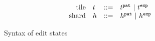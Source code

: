 \begin{figure}
\[\begin{array}{rlrl}
      \text{tile} & t & ::= &
        t^{\texttt{pat}} ~\vert~
        t^{\texttt{exp}} \\

      \text{shard} & h & ::= &
        h^{\texttt{pat}} ~\vert~
        h^{\texttt{exp}} \\
  \end{array}\]
  \caption{
    Syntax of edit states 
  }
  \label{fig:edit-state-syntax}
\end{figure}